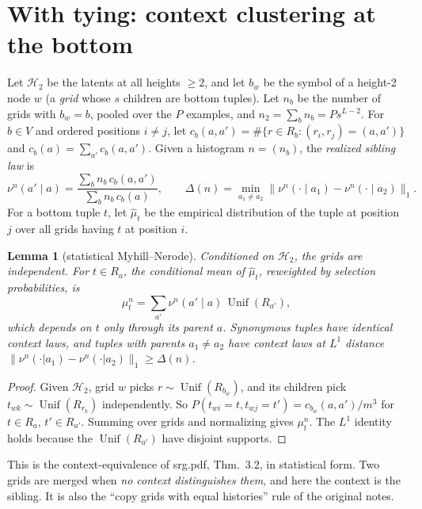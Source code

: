 \documentclass[11pt]{article}
\newtheorem{lemma}[theorem]{Lemma}
\theoremstyle{definition}
\newcommand{\Unif}{\operatorname{Unif}}
\newcommand{\norm}[1]{\lVert #1\rVert}
\newcommand{\cH}{\mathcal H}
\begin{document}
\section{With tying: context clustering at the bottom}
Let $\cH_2$ be the latents at all heights $\ge2$, and let $b_w$ be the symbol of a height-2 node
$w$ (a \emph{grid} whose $s$ children are bottom tuples). Let $n_b$ be the number of grids with
$b_w=b$, pooled over the $P$ examples, and $n_2=\sum_bn_b=Ps^{L-2}$. For $b\in V$ and ordered
positions $i\ne j$, let $c_b(a,a')=\#\{r\in R_b:(r_i,r_j)=(a,a')\}$ and
$c_b(a)=\sum_{a'}c_b(a,a')$. Given a histogram $n=(n_b)$, the \emph{realized sibling law} is
\[
\nu^{n}(a'\mid a)=\frac{\sum_bn_b\,c_b(a,a')}{\sum_bn_b\,c_b(a)},\qquad
\Delta(n)=\min_{a_1\ne a_2}\norm{\nu^n(\cdot\mid a_1)-\nu^n(\cdot\mid a_2)}_1 .
\]
For a bottom tuple $t$, let $\hat\mu_t$ be the empirical distribution of the tuple at position $j$
over all grids having $t$ at position $i$.

\begin{lemma}[statistical Myhill--Nerode]\label{lem:ctx}
Conditioned on $\cH_2$, the grids are independent. For $t\in R_a$, the conditional mean of
$\hat\mu_t$, reweighted by selection probabilities, is
\[
\mu^n_t=\sum_{a'}\nu^n(a'\mid a)\,\Unif(R_{a'}),
\]
which depends on $t$ \emph{only through its parent $a$}. Synonymous tuples have identical context
laws, and tuples with parents $a_1\ne a_2$ have context laws at $L^1$ distance
$\norm{\nu^n(\cdot|a_1)-\nu^n(\cdot|a_2)}_1\ge\Delta(n)$.
\end{lemma}
\begin{proof}
Given $\cH_2$, grid $w$ picks $r\sim\Unif(R_{b_w})$, and its children pick $t_{wk}\sim\Unif(R_{r_k})$
independently. So $P(t_{wi}=t,t_{wj}=t')=c_{b_w}(a,a')/m^3$ for $t\in R_a$, $t'\in R_{a'}$.
Summing over grids and normalizing gives $\mu^n_t$. The $L^1$ identity holds because the
$\Unif(R_{a'})$ have disjoint supports.
\end{proof}
\noindent This is the context-equivalence of srg.pdf, Thm.~3.2, in statistical form. Two grids
are merged when \emph{no context distinguishes them}, and here the context is the sibling. It is
also the ``copy grids with equal histories'' rule of the original notes.
\end{document}
